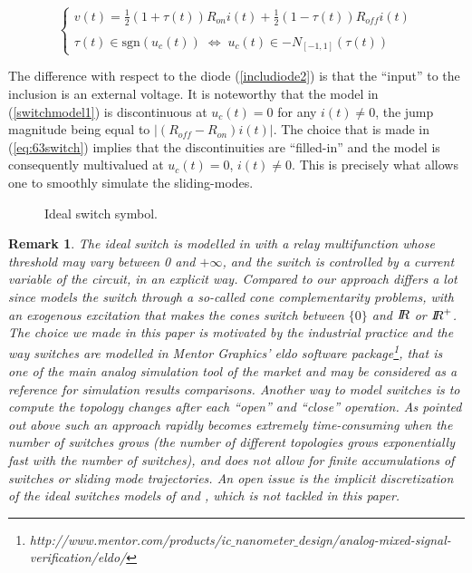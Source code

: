 \documentclass{article}
\newtheorem{remark}{Remark}
\begin{document}
\begin{equation}
  \label{eq:63switch}
\left\{\begin{array}{l}
v(t)=\frac{1}{2}(1+\tau(t))R_{on} i(t)+\frac{1}{2}(1-\tau(t))R_{off} i(t)  \\ \\ \tau(t) \in \mbox{sgn}(u_{c}(t)) \; \Leftrightarrow \; u_{c}(t) \in -N_{[-1,1]}(\tau(t))
\end{array}\right.
\end{equation}

The difference with respect to the diode (\ref{includiode2}) is that the ``input'' to the inclusion is an external voltage. It is noteworthy that the model in (\ref{switchmodel1}) is discontinuous at $u_{c}(t)=0$ for any $i(t) \not = 0$, the jump magnitude being equal to $|(R_{off}-R_{on})i(t)|$. The choice that is made in (\ref{eq:63switch}) implies that the discontinuities are ``filled-in'' and the model is consequently multivalued at $u_{c}(t)=0$,  $i(t) \not = 0$. This is precisely what allows one to smoothly simulate the sliding-modes. 



\begin{figure}
  \centering
  \scalebox{0.7}{
  
  }
  \caption{Ideal switch symbol.}
  \label{fig:IDEAL_SWITCH}
\end{figure}
 



\begin{remark}
  The  ideal switch is modelled in \cite{glocker2005} with a relay multifunction whose threshold may vary between 0 and $+\infty$, and the switch is controlled by a current variable of the circuit, in an explicit way. Compared to \cite{vasca2009} our approach differs a lot since \cite{vasca2009} models the switch through a so-called cone complementarity problems, with an exogenous excitation that makes the cones switch between $\{0\}$ and $\mbox{\rm $I\!\!R$}$ or $\mbox{\rm $I\!\!R$}^{+}$. The choice we made in this paper is motivated by the industrial practice and the way switches are modelled in Mentor Graphics' {\sc eldo} software package\footnote{http://www.mentor.com/products/ic$\_$nanometer$\_$design/analog-mixed-signal-verification/eldo/}, that is one of the main analog simulation tool of the market and may be considered as a reference for simulation results comparisons. Another way to model switches is to compute the topology changes after each ``open'' and ``close'' operation. As pointed out above such an approach rapidly becomes extremely time-consuming when the number of switches grows (the number of different topologies grows exponentially fast with the number of switches), and does not allow for finite accumulations of switches or sliding mode trajectories. An open issue is the implicit discretization of the ideal switches models of \cite{glocker2005} and \cite{vasca2009}, which is not tackled in this paper. 
\end{remark}
\end{document}

